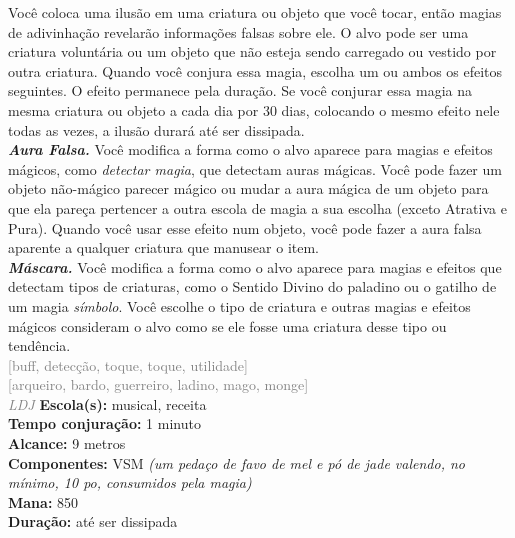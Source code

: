 \documentclass{RPG_Adventure}[2021/10/20]
\begin{document}
{\normalsize Você coloca uma ilusão em uma criatura ou objeto que você tocar, então magias de adivinhação revelarão informações falsas sobre ele. O alvo pode ser uma criatura voluntária ou um objeto que não esteja sendo carregado ou vestido por outra criatura.  Quando você conjura essa magia, escolha um ou ambos os efeitos seguintes. O efeito permanece pela duração. Se você conjurar essa magia na mesma criatura ou objeto a cada dia por 30 dias, colocando o mesmo efeito nele todas as vezes, a ilusão durará até ser dissipada.\\\t \textbf{\textit{Aura Falsa.}} Você modifica a forma como o alvo aparece para magias e efeitos mágicos, como \textit{detectar magia}, que detectam auras mágicas. Você pode fazer um objeto não-mágico parecer mágico ou mudar a aura mágica de um objeto para que ela pareça pertencer a outra escola de magia a sua escolha (exceto Atrativa e Pura). Quando você usar esse efeito num objeto, você pode fazer a aura falsa aparente a qualquer criatura que manusear o item.\\\t \textbf{\textit{Máscara.}} Você modifica a forma como o alvo aparece para magias e efeitos que detectam tipos de criaturas, como o Sentido Divino do paladino ou o gatilho de um magia \textit{símbolo}. Você escolhe o tipo de criatura e outras magias e efeitos mágicos consideram o alvo como se ele fosse uma criatura desse tipo ou tendência.\\}
{\scriptsize \textcolor{gray}{[buff, detecção, toque, toque, utilidade]\\}}
{\scriptsize \textcolor{gray}{[arqueiro, bardo, guerreiro, ladino, mago, monge]\\}}
{\tiny \textcolor{gray}{\textit{LDJ}}}\jump{}
{\small \t \textbf{Escola(s):} musical, receita\\\t \textbf{Tempo conjuração:} 1 minuto\\\t \textbf{Alcance:} 9 metros\\\t \textbf{Componentes:} VSM \textit{(um pedaço de favo de mel e pó de jade valendo, no mínimo, 10 po, consumidos pela magia)}\\\t \textbf{Mana:} 850\\\t \textbf{Duração:} até ser dissipada\\}
\end{document}

